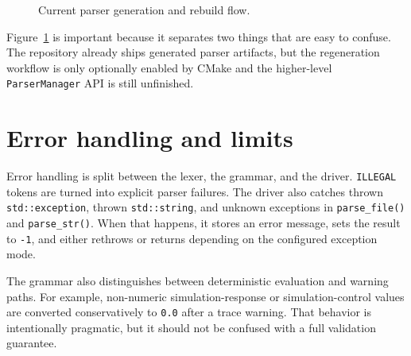 \begin{figure}[htbp]
\centering
\caption{Current parser generation and rebuild flow.}
\label{fig:parser-generation-flow}
\end{figure}

Figure~\ref{fig:parser-generation-flow} is important because it separates two
things that are easy to confuse. The repository already ships generated parser
artifacts, but the regeneration workflow is only optionally enabled by CMake
and the higher-level \texttt{ParserManager} API is still unfinished.

\section{Error handling and limits}
\label{sec:parser-errors-limits}

Error handling is split between the lexer, the grammar, and the driver.
\texttt{ILLEGAL} tokens are turned into explicit parser failures. The driver
also catches thrown \texttt{std::exception}, thrown \texttt{std::string}, and
unknown exceptions in \texttt{parse\_file()} and \texttt{parse\_str()}. When
that happens, it stores an error message, sets the result to \texttt{-1}, and
either rethrows or returns depending on the configured exception mode.

The grammar also distinguishes between deterministic evaluation and warning
paths. For example, non-numeric simulation-response or simulation-control
values are converted conservatively to \texttt{0.0} after a trace warning. That
behavior is intentionally pragmatic, but it should not be confused with a full
validation guarantee.

